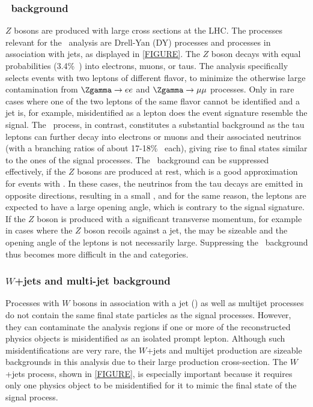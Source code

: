 \subsubsection{\Ztautau\ background}
$Z$ bosons are produced with large cross sections at the LHC. The processes relevant for the \HWW\ analysis are Drell-Yan (DY) processes and \Zgamma processes in association with jets, as displayed in \cref{FIGURE}. 
The $Z$ boson decays with equal probabilities (3.4\%~\cite{PDG2020}) into electrons, muons, or taus. 
The analysis specifically selects events with two leptons of different flavor, to minimize the otherwise large contamination from $\Zgamma \to ee$ and $\Zgamma \to \mu\mu$ processes. Only in rare cases where one of the two leptons of the same flavor cannot be identified and a jet is, for example, misidentified as a lepton does the event signature resemble the signal. 
The \Ztautau\ process, in contrast, constitutes a substantial background as the tau leptons can further decay into electrons or muons and their associated neutrinos (with a branching ratios of about 17-18\%~\cite{PDG2020} each), giving rise to final states similar to the ones of the signal processes. 
The \Ztautau\ background can be suppressed effectively, if the $Z$ bosons are produced at rest, which is a good approximation for events with \ZeroJet. In these cases, the neutrinos from the tau decays are emitted in opposite directions, resulting in a small \MET, and for the same reason, the leptons are expected to have a large opening angle, which is contrary to the signal signature. 
If the $Z$ boson is produced with a significant transverse momentum, for example in cases where the $Z$ boson recoils against a jet, the \MET may be sizeable and the opening angle of the leptons is not necessarily large. 
Suppressing the \Ztautau\ background thus becomes more difficult in the \OneJet and \TwoJet categories. 


\subsubsection{$W$+jets and multi-jet background}
Processes with $W$ bosons in association with a jet (\Wjets) as well as multijet processes do not contain the same final state particles as the signal processes. However, they can contaminate the analysis regions if one or more of the reconstructed physics objects is misidentified as an isolated prompt lepton. 
Although such misidentifications are very rare, the $W$+jets and multijet production are sizeable backgrounds in this analysis due to their large production cross-section.
The $W$+jets process, shown in \cref{FIGURE}, is especially important because it requires only one physics object to be misidentified for it to mimic the final state of the signal process.

